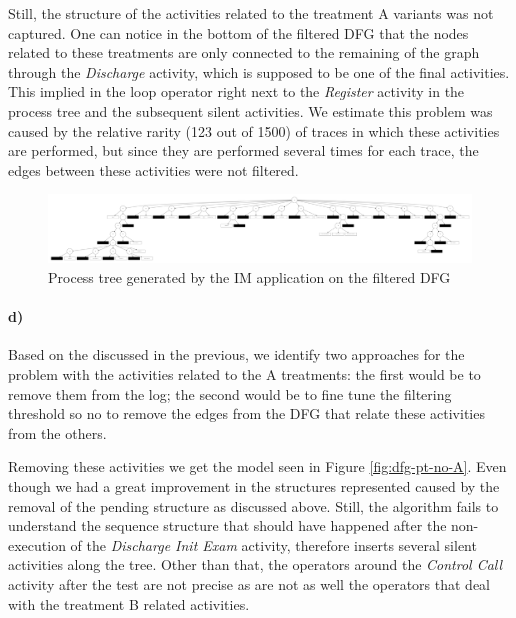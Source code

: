 \documentclass[12pt]{report}
\begin{document}
Still, the structure of the activities related to the treatment A variants was not captured. One can notice in the bottom of the filtered DFG that the nodes related to these treatments are only connected to the remaining of the graph through the \emph{Discharge} activity, which is supposed to be one of the final activities. This implied in the loop operator right next to the \emph{Register} activity in the process tree and the subsequent silent activities. We estimate this problem was caused by the relative rarity (123 out of 1500) of traces in which these activities are performed, but since they are performed several times for each trace, the edges between these activities were not filtered.

\begin{figure}[h]
    \centering
    \includegraphics[width=\textwidth]{figures/q1_c_filt_tree.pdf}
    \caption{Process tree generated by the IM application on the filtered DFG}
    \label{fig:figures-q1_c_filt_tree-pdf}
\end{figure}

\paragraph{d)} 

Based on the discussed in the previous, we identify two approaches for the problem with the activities related to the A treatments: the first would be to remove them from the log; the second would be to fine tune the filtering threshold so no to remove the edges from the DFG that relate these activities from the others.

Removing these activities we get the model seen in Figure \ref{fig:dfg-pt-no-A}. Even though we had a great improvement in the structures represented caused by the removal of the pending structure as discussed above. Still, the algorithm fails to understand the sequence structure that should have happened after the non-execution of the \emph{Discharge Init Exam} activity, therefore inserts several silent activities along the tree. Other than that, the operators around the \emph{Control Call} activity after the test are not precise as are not as well the operators that deal with the treatment B related activities. 
\end{document}
